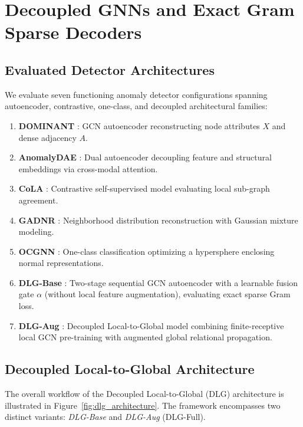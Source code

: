 \documentclass[applsci,article,submit,moreauthors,pdftex]{Definitions/mdpi}
\begin{document}
\section{Decoupled GNNs and Exact Gram Sparse Decoders}
\label{sec:models}

\subsection{Evaluated Detector Architectures}
We evaluate seven functioning anomaly detector configurations spanning autoencoder, contrastive, one-class, and decoupled architectural families:
\begin{enumerate}
    \item \textbf{DOMINANT} \cite{ding2019deep}: GCN autoencoder reconstructing node attributes $X$ and dense adjacency $A$.
    \item \textbf{AnomalyDAE} \cite{fan2020anomalydae}: Dual autoencoder decoupling feature and structural embeddings via cross-modal attention.
    \item \textbf{CoLA} \cite{liu2022cola}: Contrastive self-supervised model evaluating local sub-graph agreement.
    \item \textbf{GADNR} \cite{roy2024gadnr}: Neighborhood distribution reconstruction with Gaussian mixture modeling.
    \item \textbf{OCGNN} \cite{wang2021ocgnn}: One-class classification optimizing a hypersphere enclosing normal representations.
    \item \textbf{DLG-Base} \cite{park2026dlg}: Two-stage sequential GCN autoencoder with a learnable fusion gate $\alpha$ (without local feature augmentation), evaluating exact sparse Gram loss.
    \item \textbf{DLG-Aug} \cite{park2026dlg}: Decoupled Local-to-Global model combining finite-receptive local GCN pre-training with augmented global relational propagation.
\end{enumerate}

\subsection{Decoupled Local-to-Global Architecture}
The overall workflow of the Decoupled Local-to-Global (DLG) architecture is illustrated in Figure~\ref{fig:dlg_architecture}. The framework encompasses two distinct variants: \textit{DLG-Base} and \textit{DLG-Aug} (DLG-Full).
\end{document}
